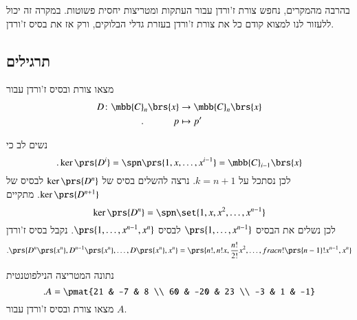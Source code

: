 \documentclass[a4paper,10pt,oneside,openany]{article}
\begin{document}
\begin{remark}
בהרבה מהמקרים, נחפש צורת ז'ורדן עבור העתקות ומטריצות יחסית פשוטות. במקרה זה יכול ללעזור לנו למצוא קודם כל את צורת ז'ורדן בעזרת גדלי הבלוקים, ורק אז את בסיס ז'ורדן.
\end{remark}

\subsection{תרגילים}

\begin{exercise}
מצאו צורת ובסיס ז'ורדן עבור
\begin{align*}
D \colon \mbb{C}_n\brs{x} &\to \mbb{C}_n\brs{x} \\
\text{.} \hphantom{lalalala} p &\mapsto p'
\end{align*}
\end{exercise}

\begin{solution}
נשים לב כי
\[\text{.} \ker\prs{D^i} = \spn\prs{1, x, \ldots, x^{i-1}} = \mbb{C}_{i-1}\brs{x}\]
לכן נסתכל על
$k = n+1$.
נרצה להשלים בסיס של
$\ker\prs{D^{n}}$
לבסיס של
$\ker\prs{D^{n+1}}$.
מתקיים
\[\ker\prs{D^n} = \spn\set{1, x, x^2, \ldots, x^{n-1}}\]
לכן נשלים את הבסיס
$\prs{1, \ldots, x^{n-1}}$
לבסיס
$\prs{1, \ldots, x^{n-1}, x^n}$.
נקבל בסיס ז'ורדן
\[\text{.} \prs{D^n\prs{x^n}, D^{n-1}\prs{x^n}, \ldots, D\prs{x^n}, x^n} = \prs{n!, n! x, \frac{n!}{2!} x^2, \ldots, frac{n!}{\prs{n-1}!} x^{n-1}, x^n}\]
\end{solution}

\begin{exercise}
נתונה המטריצה הנילפוטנטית
\[\text{.} A = \pmat{21 & -7 & 8 \\ 60 & -20 & 23 \\ -3 & 1 & -1}\]
מצאו צורת ובסיס ז'ורדן עבור
$A$.
\end{exercise}
\end{document}

